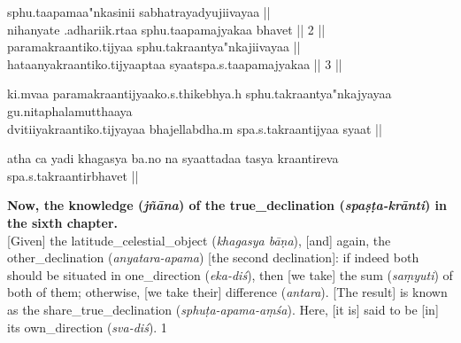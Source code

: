 {%
sphu.taapamaa"nkasi{}nii sabhatrayadyujiivayaa || \\
nihanyate .adhariik.rtaa sphu.taapamajyakaa bhavet || 2 || 
\label{sanskrit_meter_typography_example}
\\[.65\baselineskip]

%
paramakraantiko.tijyaa sphu.takraantya"nkajiivayaa || \\
hataanya\-kraantiko.tijyaaptaa syaatspa.s.taapamajyakaa || 3 ||
\medskip

%
ki.mvaa paramakraantijyaako.s.thikebhya.h sphu.takraantya"nkajyayaa gu.nitaphalamutthaaya \\dvitiiyakraantiko.tijyayaa bhajellabdha.m spa.s.takraantijyaa syaat ||
\medskip

%
atha ca yadi khagasya  ba.no na syaattadaa 
tasya kraantireva spa.s.takraantirbhavet || 
}

\clearpage{}

\textbf{Now, the \gls{knowledge} (\textit{jñāna}) of the \gls{true_declination} (\textit{spaṣṭa-krānti}) in the sixth chapter.}
\\[.325\baselineskip]

\noindent\reversemarginpar{}%
{[Given]} the \gls{latitude_celestial_object} (\textit{khagasya bāṇa}), [and] again, the \gls{other_declination} (\textit{anyatara-apama}) [\ie the second declination]: if indeed both should be situated in \gls{one_direction} (\textit{eka-diś}), then [we take] the \gls{sum} (\textit{saṃyuti}) of both of them; otherwise, [we take their] \gls{difference} (\textit{antara}). [The result] is known as the \gls{share_true_declination} (\textit{sphuṭa-apama-aṃśa}). Here, [it is] said to be [in] its \gls{own_direction} (\textit{sva-diś}). 1 
\medskip

